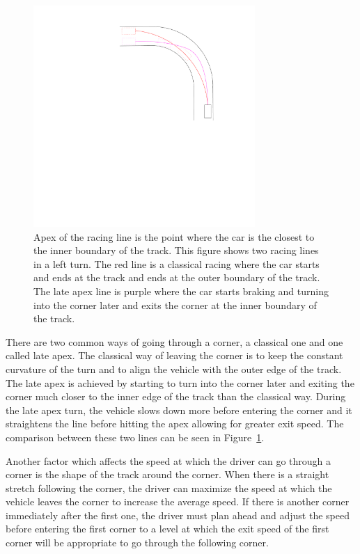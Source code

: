 \begin{figure}[b]
	\centering
	\includegraphics[trim=360 450 20 0, clip, width=0.75\textwidth]{../img/apex.pdf}
	\caption{Apex of the racing line is the point where the car is the closest to the inner boundary of the track. This figure shows two racing lines in a left turn. The red line is a classical racing where the car starts and ends at the track and ends at the outer boundary of the track. The late apex line is purple where the car starts braking and turning into the corner later and exits the corner at the inner boundary of the track.}
	\label{fig:apex}
\end{figure}

There are two common ways of going through a corner, a classical one and one called late apex. The classical way of leaving the corner is to keep the constant curvature of the turn and to align the vehicle with the outer edge of the track. The late apex is achieved by starting to turn into the corner later and exiting the corner much closer to the inner edge of the track than the classical way. During the late apex turn, the vehicle slows down more before entering the corner and it straightens the line before hitting the apex allowing for greater exit speed. The comparison between these two lines can be seen in Figure~\ref{fig:apex}.

Another factor which affects the speed at which the driver can go through a corner is the shape of the track around the corner. When there is a straight stretch following the corner, the driver can maximize the speed at which the vehicle leaves the corner to increase the average speed. If there is another corner immediately after the first one, the driver must plan ahead and adjust the speed before entering the first corner to a level at which the exit speed of the first corner will be appropriate to go through the following corner.

